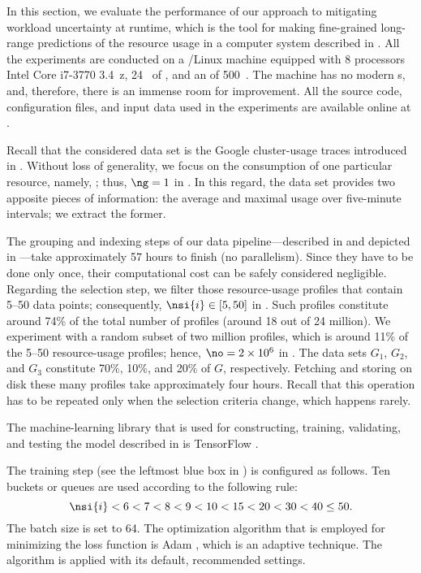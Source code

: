 In this section, we evaluate the performance of our approach to mitigating
workload uncertainty at runtime, which is the tool for making fine-grained
long-range predictions of the resource usage in a computer system described in
. All the experiments are conducted on a /Linux
machine equipped with 8 processors Intel Core i7-3770 3.4~z, 24~
of , and an  of 500~. The machine has no modern
s, and, therefore, there is an immense room for improvement. All the
source code, configuration files, and input data used in the experiments are
available online at \cite{eslab2017b}.


Recall that the considered data set is the Google cluster-usage traces
\cite{reiss2011} introduced in . Without loss of generality,
we focus on the consumption of one particular resource, namely, ;
thus, $\ng = 1$ in . In this regard, the data set provides
two apposite pieces of information: the average and maximal  usage over
five-minute intervals; we extract the former.

The grouping and indexing steps of our data pipeline---described in
 and depicted in ---take approximately
57 hours to finish (no parallelism). Since they have to be done only once, their
computational cost can be safely considered negligible. Regarding the selection
step, we filter those resource-usage profiles that contain 5--50 data points;
consequently, $\nsi{i} \in [5, 50]$ in . Such profiles
constitute around 74\% of the total number of profiles (around 18 out of 24
million). We experiment with a random subset of two million profiles, which is
around 11\% of the 5--50 resource-usage profiles; hence, $\no = 2 \times 10^6$
in . The data sets $G_1$, $G_2$, and $G_3$ constitute
70\%, 10\%, and 20\% of $G$, respectively. Fetching and storing on disk these
many profiles take approximately four hours. Recall that this operation has to
be repeated only when the selection criteria change, which happens rarely.


The machine-learning library that is used for constructing, training,
validating, and testing the model described in  is
TensorFlow \cite{abadi2015}.

The training step (see the leftmost blue box in ) is
configured as follows. Ten buckets or queues are used according to the following
rule:
\[
  \nsi{i} < 6 < 7 < 8 < 9 < 10 < 15 < 20 < 30 < 40 \leq 50.
\]
The batch size \nb is set to 64. The optimization algorithm that is employed for
minimizing the loss function is Adam \cite{kingma2014}, which is an adaptive
technique. The algorithm is applied with its default, recommended settings.

